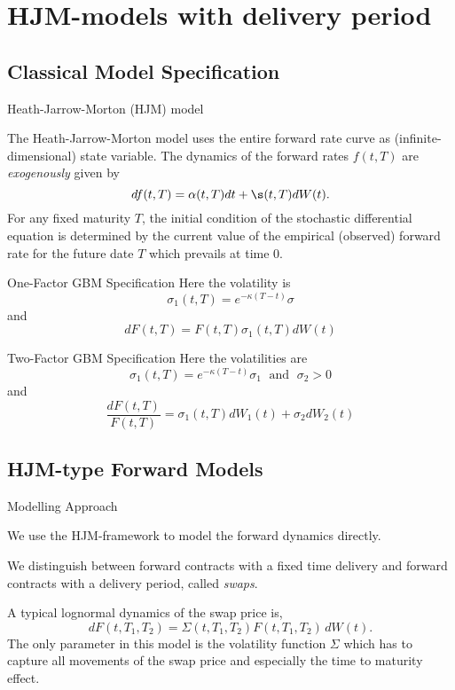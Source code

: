 \section{HJM-models with delivery period}
\subsection{Classical Model Specification}

{ Heath-Jarrow-Morton (HJM) model}

The Heath-Jarrow-Morton model uses the entire forward rate curve as
(infinite-dimensional) state variable. The dynamics of the forward rates $f(t,T)$ are {\it exogenously} given by
$$
df(t,T) = \alpha(t,T) dt + \s(t,T) dW(t).
$$
For any fixed maturity $T$, the
initial condition of the stochastic differential equation
is determined by the current value
of the empirical (observed) forward rate for the future date $T$
which prevails at time $0$.

{One-Factor GBM Specification}
Here the volatility is
$$
\sigma_1(t,T)=e^{-\kappa (T-t)}\sigma
$$
and
$$
dF(t,T)=F(t,T)\sigma_1(t,T)dW(t)
$$

{Two-Factor GBM Specification}
Here the volatilities are
$$
\sigma_1(t,T)=e^{-\kappa (T-t)}\sigma_1 \; \mbox{ and } \; \sigma_2>0
$$
and
$$
\frac{dF(t,T)}{F(t,T)}=\sigma_1(t,T)dW_1(t)+\sigma_2dW_2(t)
$$

\subsection{HJM-type Forward Models}

{Modelling Approach}






	We use the HJM-framework to model the forward dynamics directly.

	We distinguish between forward contracts with a fixed time delivery and forward contracts with a delivery period, called \emph{swaps}.

	A typical lognormal dynamics of the swap price is,
\begin{equation}
dF(t,T_1,T_2)=\Sigma(t,T_1,T_2)F(t,T_1,T_2)\, dW(t). \label{eqn: lognormal dynamics}
\end{equation}
The only parameter in this model is the volatility function $\Sigma$ which has to capture all movements of the swap price and especially the time to maturity effect.



